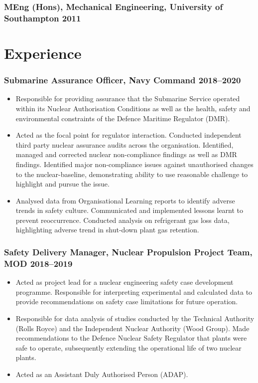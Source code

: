 \documentclass[a4paper, oneside, final, 11pt]{scrartcl} %
\begin{document}
\subsubsection*{MEng (Hons), \textnormal{Mechanical Engineering, University of Southampton} \hfill 2011} 

\medskip

\section{Experience}

\subsubsection*{Submarine Assurance Officer, Navy Command \hfill 2018--2020}  
\normalfont
\begin{itemize}
	\item Responsible for providing
assurance that the Submarine Service operated within its Nuclear Authorisation Conditions as well as the health, safety and environmental constraints of the Defence Maritime Regulator (DMR).
	\item Acted as the focal point for regulator interaction. Conducted independent third party nuclear assurance audits across the organisation. Identified, managed and corrected nuclear non-compliance findings as well as DMR findings. Identified major non-compliance issues against unauthorised changes to the nuclear-baseline, demonstrating ability to use reasonable challenge to highlight and pursue the issue. 
	\item Analysed data from Organisational Learning reports to identify adverse trends in safety culture. Communicated and implemented lessons learnt to prevent reoccurrence. Conducted analysis on refrigerant gas loss data, highlighting adverse trend in shut-down plant gas retention. 
\end{itemize}


\subsubsection*{Safety Delivery Manager,  Nuclear Propulsion Project Team, MOD \hfill 2018--2019}  
\normalfont
\begin{itemize}
	\item Acted as project lead for a nuclear engineering safety case development programme.  Responsible for interpreting experimental and calculated data to provide recommendations on safety case limitations for future operation.
	\item Responsible for data analysis of studies conducted by the Technical Authority (Rolls Royce) and the Independent Nuclear Authority (Wood Group). Made recommendations to the Defence Nuclear Safety Regulator that plants were safe to operate,  subsequently extending the operational life of two nuclear plants.
	\item Acted as an Assistant Duly Authorised Person (ADAP). 
\end{itemize}
\end{document}
